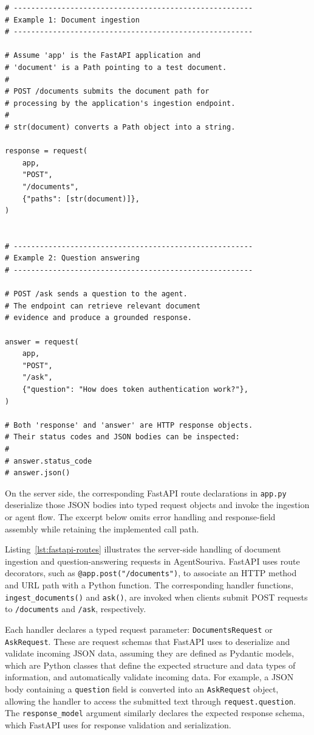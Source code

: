\begin{lstlisting}[style=pythonlearning,
caption={Testing AgentSouriva's HTTP API in-process},
label={lst:api-test}]
# -------------------------------------------------------
# Example 1: Document ingestion
# -------------------------------------------------------

# Assume 'app' is the FastAPI application and
# 'document' is a Path pointing to a test document.
#
# POST /documents submits the document path for
# processing by the application's ingestion endpoint.
#
# str(document) converts a Path object into a string.

response = request(
    app,
    "POST",
    "/documents",
    {"paths": [str(document)]},
)


# -------------------------------------------------------
# Example 2: Question answering
# -------------------------------------------------------

# POST /ask sends a question to the agent.
# The endpoint can retrieve relevant document
# evidence and produce a grounded response.

answer = request(
    app,
    "POST",
    "/ask",
    {"question": "How does token authentication work?"},
)

# Both 'response' and 'answer' are HTTP response objects.
# Their status codes and JSON bodies can be inspected:
#
# answer.status_code
# answer.json()

\end{lstlisting}


On the server side, the corresponding FastAPI route declarations in \texttt{app.py} deserialize those JSON bodies into typed request objects and invoke the ingestion or agent flow. The excerpt below omits error handling and response-field assembly while retaining the implemented call path.

\noindent
Listing~\ref{lst:fastapi-routes} illustrates the server-side
handling of document ingestion and question-answering requests
in AgentSouriva. FastAPI uses route decorators, such as
\texttt{@app.post("/documents")}, to associate an HTTP method
and URL path with a Python function. The corresponding
handler functions, \texttt{ingest\_documents()} and
\texttt{ask()}, are invoked when clients submit POST requests
to \texttt{/documents} and \texttt{/ask}, respectively.

Each handler declares a typed request parameter:
\texttt{DocumentsRequest} or \texttt{AskRequest}. These are
request schemas that FastAPI uses to deserialize and validate
incoming JSON data, assuming they are defined as Pydantic
models, which are Python classes that define the expected structure and data types of information, and automatically validate incoming data. For example, a JSON body containing a
\texttt{question} field is converted into an
\texttt{AskRequest} object, allowing the handler to access
the submitted text through \texttt{request.question}.
The \texttt{response\_model} argument similarly declares
the expected response schema, which FastAPI uses for
response validation and serialization.


